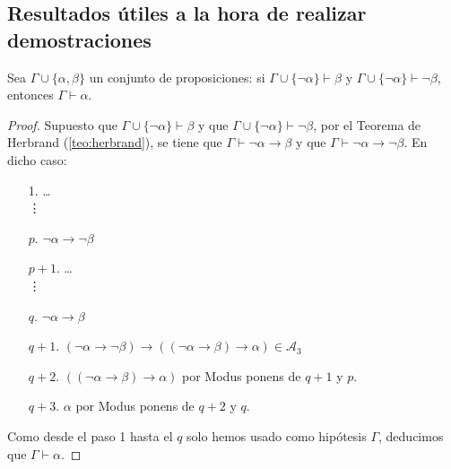 \subsection{Resultados útiles a la hora de realizar demostraciones}
\begin{prop}
    Sea $\Gamma\cup\{\alpha,\beta\}$ un conjunto de proposiciones: si $\Gamma\cup\{\lnot\alpha\}\vdash \beta$ y $\Gamma\cup\{\lnot\alpha\}\vdash \lnot\beta$, entonces $\Gamma\vdash \alpha$.
    \begin{proof}
        Supuesto que $\Gamma\cup\{\lnot\alpha\}\vdash \beta$ y que $\Gamma\cup\{\lnot\alpha\}\vdash \lnot\beta$, por el Teorema de Herbrand (\ref{teo:herbrand}), se tiene que $\Gamma\vdash \lnot\alpha\to\beta$ y que $\Gamma\vdash \lnot\alpha\to\lnot\beta$. En dicho caso:
        \begin{enumerate}
            \item[1.] \ldots \\
                \vdots
            \item[$p$.] $\lnot\alpha\to\lnot\beta$
            \item[$p+1$.] \ldots \\
                \vdots
            \item[$q$.] $\lnot\alpha\to\beta$
            \item[$q+1$.] $(\lnot\alpha\to\lnot\beta)\to((\lnot\alpha\to\beta)\to\alpha)\in \mathcal{A}_3$
            \item[$q+2$.] $((\lnot\alpha\to\beta)\to\alpha)$ por Modus ponens de $q+1$ y $p$.
            \item[$q+3$.] $\alpha$ por Modus ponens de $q+2$ y $q$.
        \end{enumerate}
        Como desde el paso 1 hasta el $q$ solo hemos usado como hipótesis $\Gamma$, deducimos que $\Gamma\vdash \alpha$.
    \end{proof}
\end{prop}

